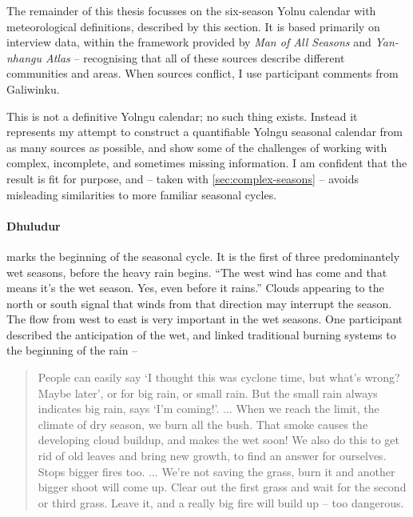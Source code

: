 The remainder of this thesis focusses on the six-season Yolnu calendar with
meteorological definitions, described by this section.
It is based primarily on interview data, within
the framework provided by \textit{Man of All Seasons} \citep{davis1989} and
\textit{Yan-nhangu Atlas} \citep[][p36]{atlas2014} -- recognising that all of these
sources describe different communities and areas.  When sources conflict, I
use participant comments from Galiwinku.

This is not a definitive Yolngu calendar; no such
thing exists.  Instead it represents my attempt to construct a quantifiable
Yolngu seasonal calendar from as many sources as possible, and show some of
the challenges of working with complex, incomplete, and sometimes missing
information.  I am confident that the result is fit for purpose, and -- taken
with \cref{sec:complex-seasons} -- avoids misleading similarities to
more familiar seasonal cycles.


\paragraph{Dhuludur} marks the beginning of the seasonal cycle.  It is the
first of three predominantely wet seasons, before the heavy rain begins.
%
``The west wind has come and that means it's the wet season.  Yes, even
before it rains.''  Clouds appearing to the north or south signal that
winds from that direction may interrupt the season.   The flow from west
to east is very important in the wet seasons.
%
One participant described the anticipation of the wet, and linked traditional
burning systems to the beginning of the rain --
\begin{quote}
    People can easily say `I thought this was cyclone time, but what's wrong?
    Maybe later', or for big rain, or small rain.  But the small rain always
    indicates big rain, says `I'm coming!'.
    ...
    When we reach the limit, the climate of dry season, we burn all the bush.
    That smoke causes the developing cloud buildup, and makes the wet soon!
    We also do this to get rid of old leaves and bring new growth,
    to find an answer for ourselves.  Stops bigger fires too.
    ...
    We're not saving the grass, burn it and another bigger shoot will come up.
    Clear out the first grass and wait for the second or third grass.
    Leave it, and a really big fire will build up -- too dangerous.
\end{quote}

